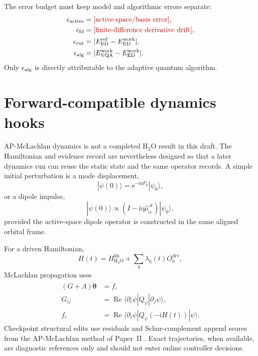\documentclass[
  reprint,
  amsmath,
  amssymb,
  aps,
  pra,
  nofootinbib,
  superscriptaddress,
  floatfix
]{revtex4-2}
\newcommand{\placeholder}[1]{\textcolor{red!70!black}{\ifmmode\left[#1\right]\else\textsf{[#1]}\fi}}
\newcommand{\ii}{\mathrm{i}}
\newcommand{\ee}{\mathrm{e}}
\newcommand{\Reop}{\operatorname{Re}}
\newcommand{\ket}[1]{|#1\rangle}
\newcommand{\bra}[1]{\langle #1|}
\newcommand{\Acal}{\mathcal{A}}
\newcommand{\drv}{\mathrm{drv}}
\newcommand{\ed}{\mathrm{ED}}
\newcommand{\HtwoO}{\mathrm{H_2O}}
\newcommand{\lin}{\mathrm{lin}}
\newcommand{\APM}{\mathrm{AP}\text{-}\mathrm{McLachlan}}
\newcommand{\work}{\mathrm{work}}
\newcommand{\refc}{\mathrm{ref}}
\begin{document}
The error budget must keep model and algorithmic errors separate:
\begin{align}
\epsilon_{\rm active}
&=
\placeholder{\text{active-space/basis error}},
\nonumber\\
\epsilon_{\rm fd}
&=
\placeholder{\text{finite-difference derivative drift}},
\nonumber\\
\epsilon_{\rm cut}
&=
|E_{\ed}^{\refc}-E_{\ed}^{\work}|,
\nonumber\\
\epsilon_{\rm alg}
&=
|E_{\rm VQA}^{\work}-E_{\ed}^{\work}|.
\label{eq:error_budget}
\end{align}
Only \(\epsilon_{\rm alg}\) is directly attributable to the adaptive quantum algorithm.

\section{Forward-compatible dynamics hooks}
\label{sec:dynamics_hooks}

\(\APM\) dynamics is not a completed \(\HtwoO\) result in this draft.  The Hamiltonian and evidence record are nevertheless designed so that a later dynamics run can reuse the static state and the same operator records.  A simple initial perturbation is a mode displacement,
\begin{equation}
\ket{\psi(0)}
=
\ee^{-\ii\eta P_\mu}\ket{\psi_0},
\label{eq:displaced_initial_state}
\end{equation}
or a dipole impulse,
\begin{equation}
\ket{\psi(0)}
\propto
(I-\ii\eta \hat\mu_\alpha^{\Acal})\ket{\psi_0},
\label{eq:dipole_impulse}
\end{equation}
provided the active-space dipole operator is constructed in the same aligned orbital frame.

For a driven Hamiltonian,
\begin{equation}
H(t)
=
H_{\HtwoO}^{\lin}
+
\sum_{\eta}\lambda_\eta(t)O_\eta^{\drv},
\label{eq:driven_hamiltonian}
\end{equation}
McLachlan propagation uses
\begin{align}
(G+\Lambda)\dot{\boldsymbol\theta}
&=
f,
\nonumber\\
G_{ij}
&=
\Reop\bra{\partial_i\psi}Q_\psi\ket{\partial_j\psi},
\nonumber\\
f_i
&=
\Reop\bra{\partial_i\psi}Q_\psi(-\ii H(t))\ket{\psi}.
\label{eq:mclachlan_equations}
\end{align}
Checkpoint structural edits use residuals and Schur-complement append scores from the \(\APM\) method of Paper~II \cite{StrobelPaperIIMcLachlan}.  Exact trajectories, when available, are diagnostic references only and should not enter online controller decisions.
\end{document}
